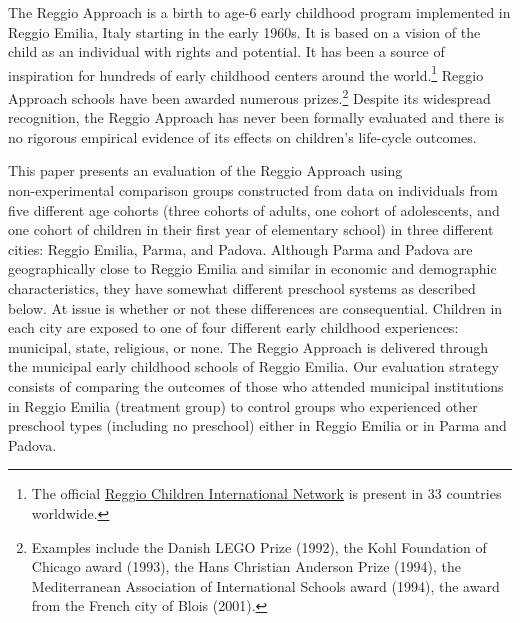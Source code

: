 The Reggio Approach is a birth to age-6 early childhood program implemented in Reggio Emilia, Italy starting in the early 1960s. It is based on a vision of the child as an individual with rights and potential. It has been a source of inspiration for hundreds of early childhood centers around the world.\footnote{The official \href{http://www.reggiochildren.it/network/?lang=en}{Reggio Children International Network} is present in 33 countries worldwide.} Reggio Approach schools have been awarded numerous prizes.\footnote{Examples include the Danish LEGO Prize (1992), the Kohl Foundation of Chicago award (1993), the Hans Christian Anderson Prize (1994), the Mediterranean Association of International Schools award (1994), the award from the French city of Blois (2001).} Despite its widespread recognition, the Reggio Approach has never been formally evaluated and there is no rigorous empirical evidence of its effects on children's life-cycle outcomes.

This paper presents an evaluation of the Reggio Approach using \\ non-experimental comparison groups constructed from data on individuals from five different age cohorts (three cohorts of adults, one cohort of adolescents, and one cohort of children in their first year of elementary school) in three different cities: Reggio Emilia, Parma, and Padova. Although Parma and Padova are geographically close to Reggio Emilia and similar in economic and demographic characteristics, they have somewhat different preschool systems as described below. At issue is whether or not these differences are consequential. Children in each city are exposed to one of four different early childhood experiences: municipal, state, religious, or none. The Reggio Approach is delivered through the municipal early childhood schools of Reggio Emilia. Our evaluation strategy consists of comparing the outcomes of those who attended municipal institutions in Reggio Emilia (treatment group) to control groups who experienced other preschool types (including no preschool) either in Reggio Emilia or in Parma and Padova.

